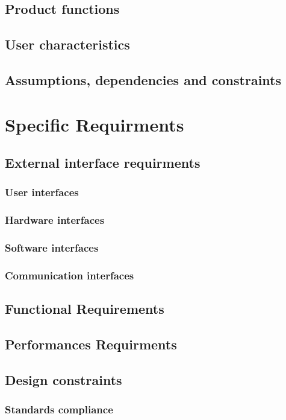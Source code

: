 \documentclass[12pt,a4paper]{report}
\begin{document}
	\section{Product functions}
	\section{User characteristics}
	\section{Assumptions, dependencies and constraints}

\chapter{Specific Requirments}
	\section{External interface requirments}
		\subsection{User interfaces}
		\subsection{Hardware interfaces}
		\subsection{Software interfaces}
		\subsection{Communication interfaces}
	\section{Functional Requirements}
	\section{Performances Requirments}
	\section{Design constraints}
		\subsection{Standards compliance}
\end{document}
